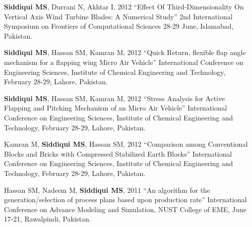 \begin{cventries}
{\begin{cvitems}
			\item{\textbf{Siddiqui MS}, Durrani N, Akhtar I, 2012 “Effect Of Third-Dimensionality On Vertical Axis Wind Turbine Blades: A Numerical Study” 2nd International Symposium on Frontiers of Computational Sciences 28-29 June, Islamabad, Pakistan.}
			\item{\textbf{Siddiqui MS}, Hassan SM, Kamran M, 2012 “Quick Return, flexible flap angle mechanism for a flapping wing Micro Air Vehicle” International Conference on Engineering Sciences, Institute of Chemical Engineering and Technology, February 28-29, Lahore, Pakistan.}
			\item{\textbf{Siddiqui MS}, Hassan SM, Kamran M, 2012 “Stress Analysis for Active Flapping and Pitching Mechanism of an Micro Air Vehicle” International Conference on Engineering Sciences, Institute of Chemical Engineering and Technology, February 28-29, Lahore, Pakistan.}
			\item{Kamran M, \textbf{Siddiqui MS}, Hassan SM, 2012 “Comparison among Conventional Blocks and Bricks with Compressed Stabilized Earth Blocks” International Conference on Engineering Sciences, Institute of Chemical Engineering and Technology, February 28-29, Lahore, Pakistan.}
			\item{Hassan SM, Nadeem M, \textbf{Siddiqui MS}, 2011 “An algorithm for the generation/selection of process plans based upon production rate” International Conference on Advance Modeling and Simulation, NUST College of EME, June 17-21, Rawalpindi, Pakistan.}    
		\end{cvitems}
	}
\end{cventries}